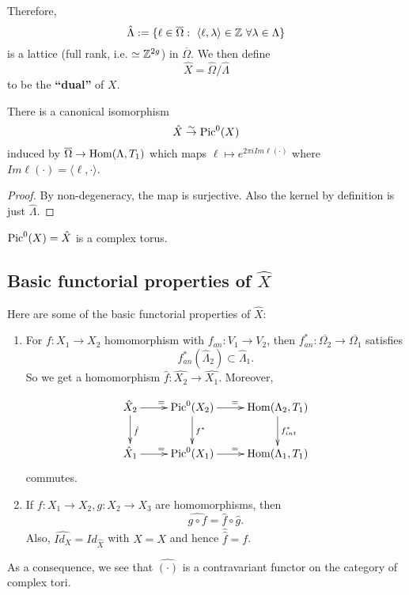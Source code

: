 Therefore, 
$$\hat{\Lambda}:=\{\ell \in \overline{\Omega}:\ \langle \ell,\lambda\rangle\in {\mathbb Z}\ \forall \lambda\in \Lambda\}$$
is a lattice (full rank, i.e. $\simeq {\mathbb Z}^{2g}$) in $\overline{\Omega}$. We then define 
$$\hat{X}=\hat{\Omega}/\hat{\Lambda}$$
to be the \textbf{``dual''} of $X$. 
\begin{theorem}
There is a canonical isomorphism 
$$\hat{X}\overset{\sim}{\rightarrow} \operatorname{Pic}^0(X)$$
induced by $\overline{\Omega}\to \operatorname{Hom}(\Lambda,T_1)$ which maps $\ell\mapsto e^{2\pi i Im\ell (\cdot)}$ where $Im \ell(\cdot)=\langle \ell,\cdot\rangle$. 
\end{theorem}

\begin{proof}
By non-degeneracy, the map is surjective. Also the kernel by definition is just $\hat{\Lambda}$. 
\end{proof}

\begin{corollary}
$\operatorname{Pic}^0(X)=\hat{X}$ is a complex torus.
\end{corollary}

\subsection{Basic functorial properties of $\hat{X}$}

Here are some of the basic functorial properties of $\hat{X}$:

\begin{enumerate}
\item For $f:X_1\to X_2$ homomorphism with $f_{an}:V_1\to V_2$, then $f_{an}^*:\overline{\Omega_2}\to \overline{\Omega_1}$ satisfies 
$$f_{an}^*(\hat{\Lambda}_2)\subset \hat{\Lambda}_1.$$
So we get a homomorphism $\hat{f}:\hat{X_2}\to \hat{X_1}$. Moreover, 

\[
\xymatrix{
\hat{X}_2 \ar[d]^{\hat{f}}\ar[r]^= &\Pic^0(X_2) \ar[d]^{f^*}\ar[r]^= & \Hom(\Lambda_2,T_1) \ar[d]^{f_{int}^*}\\
\hat{X}_1 \ar[r]^= &\Pic^0(X_1) \ar[r]^= &\Hom(\Lambda_1,T_1)
}
\]
commutes.

\item If $f:X_1\to X_2, g:X_2\to X_3$ are homomorphisms, then 
$$\widehat{g\circ f}=\hat{f}\circ \hat{g}.$$
Also, $\hat{Id_X}= Id_{\hat{X}}$ with $\hat{\hat{X}}=X$ and hence $\hat{\hat{f}}=f$. 

\end{enumerate}

As a consequence, we see that $\hat{(\cdot)}$ is a contravariant functor on the category of complex tori.

